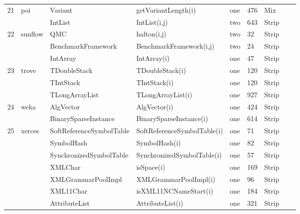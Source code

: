 \documentclass[runningheads,a4paper]{llncs}
\begin{document}
\begin{table}[h]
{\begin{tabular}{|l|l|l|l|l|l|l|l|l|}
21	&	poi			& Variant				& getVariantLength(i)		& one		& 476	& Mix  										\\ 
	&				& IntList					& IntList(i,j)				& two		& 643	& Strip 										\\ 	
22	&	sunflow		& QMC					& halton(i,j)				& two		& 32	& Strip  										\\ 
	&				& BenchmarkFramework	& BenchmarkFramework(i,j) & two		& 24	& Strip   										\\ 
	&				& IntArray				& IntArray(i)				& one		& 47	& Strip 										\\ 	
23	&	trove		& TDoubleStack			& TDoubleStack(i)		& one		& 120	& Strip  										\\ 
	&				& TIntStack				& TIntStack(i)			& one		& 120	& Strip  										\\ 
	&				& TLongArrayList			& TLongArrayList(i)		& one		& 927	& Strip  										\\ 
24	&	weka		& AlgVector				& AlgVector(i)			& one		& 424	& Strip  										\\ 
	&				& BinarySparseInstance	& BinarySparseInstance(i)& one		& 614	& Strip 										\\ 
25	&	xerces		& SoftReferenceSymbolTable& SoftReferenceSymbolTable(i) & one	& 71	& Strip  										\\ 
	&				& SymbolHash			& SymbolHash(i)			& one		& 82	& Strip 										\\ 
	&				& SynchronizedSymbolTable& SynchronizedSymbolTable(i) & one	& 57	& Strip  										\\ 
	&				& XMLChar				& isSpace(i)				& one		& 169	& Strip 										\\ 
	&				& XMLGrammarPoolImpl	& XMLGrammarPoolImpl(i)	& one		& 96	& Strip   										\\ 
	&				& XML11Char			& isXML11NCNameStart(i)	& one		& 184	& Strip  										\\ 
	&				& AttributeList			& AttributeList(i)			& one		& 321	& Strip  										\\ 
\hline
\end{tabular}
}
\bigskip
\label{table:failureDomains6}
\end{table}
\end{document}
